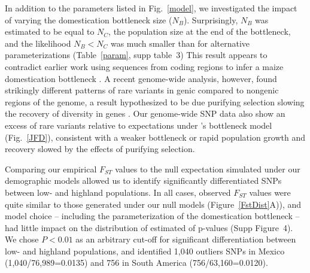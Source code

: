 In addition to the parameters listed in Fig.~\ref{model}, we investigated the impact of varying the domestication bottleneck size ($N_B$).  
Surprisingly, $N_B$ was estimated to be equal to $N_C$, the population size at the end of the bottleneck, and the likelihood $N_B<N_C$ was much smaller than for alternative parameterizations (Table~\ref{param}, supp table~3) 
This result appears to contradict earlier work using sequences from coding regions to infer a maize domestication bottleneck \cite{Wright_2005_15919994, Tenaillon2004}.   A recent genome-wide analysis, however, found strikingly different patterns of rare variants in genic compared to nongenic regions of the genome, a result hypothesized to be due purifying selection slowing the recovery of diversity in genes \cite{Hufford_2012_22660546}. Our genome-wide SNP data also show an excess of rare variants relative to expectations under \cite{Wright_2005_15919994}'s bottleneck model (Fig.~\ref{JFD}), consistent with a weaker bottleneck or rapid population growth and recovery slowed by the effects of purifying selection.  

Comparing our empirical $F_{ST}$ values to the null expectation simulated under our demographic models allowed us to identify significantly differentiated SNPs between low- and highland populations. In all cases, observed $F_{ST}$ values were quite similar to those generated under our null models  (Figure~\ref{FstDist}A)), and model choice -- including the parameterization of the domestication bottleneck -- had little impact on the distribution of estimated of p-values (Supp Figure~4). We chose $P<0.01$ as an arbitrary cut-off for significant differentiation between low- and highland populations, and identified 1,040 outliers SNPs in Mexico (1,040/76,989=0.0135) and 756 in South America (756/63,160=0.0120).  

%

